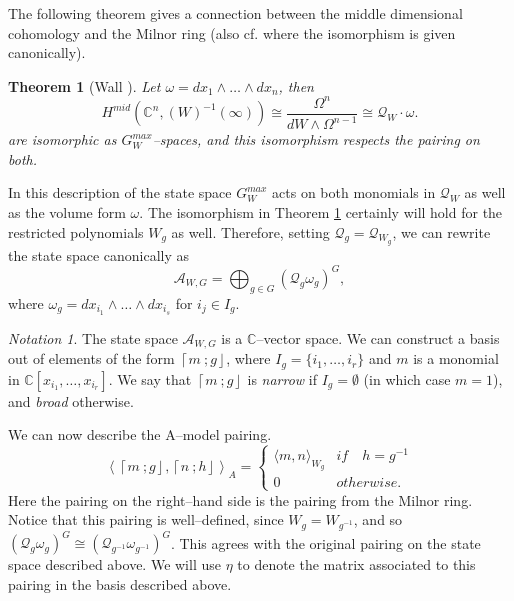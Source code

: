 \documentclass[10pt, letterpaper]{amsart}
\newtheorem{thm}{Theorem}%
\theoremstyle{remark}
\newtheorem{notat}{Notation}
\newcommand{\CC}{\mathbb C}
\newcommand{\sA}{\mathscr{A}}
\newcommand{\sQ}{\mathscr{Q}}
\newcommand{\fjrw}[2]{ \left\lceil #1 \:; #2 \right\rfloor }
\newcommand{\defital}{\textit}
\newcommand{\zero}{\mathbf 0}
\begin{document}
The following theorem gives a connection between the middle dimensional cohomology and the Milnor ring (also cf. \cite{ChIR} where the isomorphism is given canonically). 

\begin{thm}[Wall \cite{Wall1}]\label{t:Wall}
Let $\omega = dx_1 \wedge \ldots \wedge dx_n$, then 
\[
H^{mid} (\CC^n,(W)^{-1}( \infty)) \cong  \frac{ \Omega^n}{dW \wedge\Omega^{n-1}} \cong \sQ_W\cdot \omega.
\]
are isomorphic as $G_W^{max}$--spaces, and this isomorphism respects the pairing on both. 
\end{thm}

In this description of the state space %
$G_W^{max}$  acts on both monomials in $\sQ_W$ as well as the volume form $\omega$.
The isomorphism in Theorem \ref{t:Wall} certainly will hold for the restricted polynomials $W_g$ as well.  Therefore, setting $\sQ_g=\sQ_{W_g}$, we can rewrite the state space canonically as 
\begin{equation}\label{state_space}
\sA_{W,G} = \bigoplus_{g \in G} \left(\sQ_g \omega_g \right)^G,
\end{equation}
where $\omega_g = dx_{i_1} \wedge \ldots \wedge dx_{i_s}$ for $i_j \in I_g$.

\begin{notat}\label{FJRWNotation}
The state space $\sA_{W,G}$ is a $\CC$--vector space. We can construct a basis out of elements of the form $\fjrw{m}{g}$, where $I_g = \{i_1, \ldots, i_r\}$ and $m$ is a monomial in $\CC[x_{i_1}, \ldots, x_{i_r}]$.  We say that $\fjrw{m}{g}$ is \defital{narrow} if $ I_g = \emptyset$ (in which case $m=1$), and \defital{broad} otherwise.
\end{notat}


We can now describe the A--model pairing. 
\begin{equation}\label{e:pairing}
\left\langle\fjrw{m}{g},\fjrw{n}{h} \right\rangle_A = \left\{ \begin{array}{cc}
							\langle m,n\rangle_{W_g} & if \quad h = g^{-1}\\
							0		& otherwise.
							\end{array}\right.
\end{equation}
Here the pairing on the right--hand side is the pairing from the Milnor ring. Notice that this pairing is well--defined, since $W_g = W_{g^{-1}}$, and so $(\sQ_{g}\omega_g)^{G} \cong (\sQ_{g^{-1}}\omega_{g^{-1}})^{G}$. This agrees with the original pairing on the state space described above.   
We will  use $\eta$ to denote the matrix associated to this pairing in the basis described above. 
\end{document}
